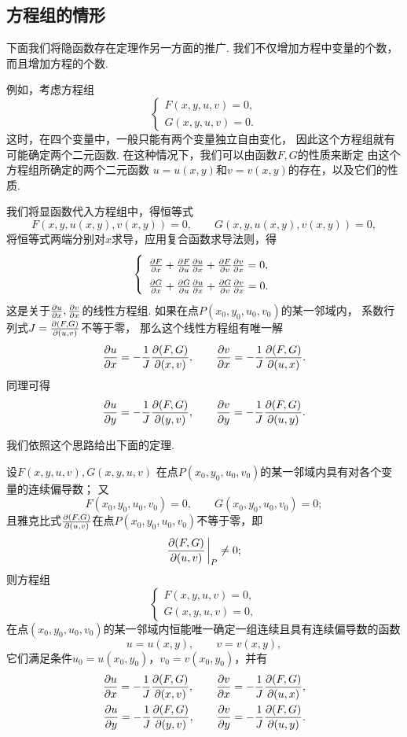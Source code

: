 \subsection{方程组的情形}
下面我们将隐函数存在定理作另一方面的推广.
我们不仅增加方程中变量的个数，而且增加方程的个数.

例如，考虑方程组\[
	\left\{ \begin{array}{c}
		F(x,y,u,v)=0, \\
		G(x,y,u,v)=0.
	\end{array} \right.
\]
这时，在四个变量中，一般只能有两个变量独立自由变化，
因此这个方程组就有可能确定两个二元函数.
在这种情况下，我们可以由函数\(F,G\)的性质来断定
由这个方程组所确定的两个二元函数
\(u=u(x,y)\)和\(v=v(x,y)\)的存在，以及它们的性质.

我们将显函数代入方程组中，得恒等式\[
	F(x,y,u(x,y),v(x,y))=0, \qquad
	G(x,y,u(x,y),v(x,y))=0,
\]
将恒等式两端分别对\(x\)求导，应用复合函数求导法则，得\[
	\left\{ \def\arraystretch{1.6} \begin{array}{l}
		\pdv{F}{x}+\pdv{F}{u}\pdv{u}{x}+\pdv{F}{v}\pdv{v}{x}=0, \\
		\pdv{G}{x}+\pdv{G}{u}\pdv{u}{x}+\pdv{G}{v}\pdv{v}{x}=0.
	\end{array} \right.
\]
这是关于\(\pdv{u}{x},\pdv{v}{x}\)的线性方程组.
如果在点\(P(x_0,y_0,u_0,v_0)\)的某一邻域内，
系数行列式\(J=\pdv{ (F,G) }{ (u,v) }\)不等于零，
那么这个线性方程组有唯一解\[
	\pdv{u}{x} = -\frac{1}{J} \pdv{ (F,G) }{ (x,v) }, \qquad
	\pdv{v}{x} = -\frac{1}{J} \pdv{ (F,G) }{ (u,x) }.
\]
同理可得\[
	\pdv{u}{y} = -\frac{1}{J} \pdv{ (F,G) }{ (y,v) }, \qquad
	\pdv{v}{y} = -\frac{1}{J} \pdv{ (F,G) }{ (u,y) }.
\]

我们依照这个思路给出下面的定理.
\begin{theorem}[隐函数存在定理3]\label{theorem:多元函数微分法.隐函数存在定理3}
设\(F(x,y,u,v),G(x,y,u,v)\)
在点\(P(x_0,y_0,u_0,v_0)\)的某一邻域内具有对各个变量的连续偏导数；
又\[
	F(x_0,y_0,u_0,v_0)=0, \qquad
	G(x_0,y_0,u_0,v_0)=0;
\]
且雅克比式\(\pdv{ (F,G) }{ (u,v) }\)在点\(P(x_0,y_0,u_0,v_0)\)不等于零，即\[
	\jacobi{F,G}{u,v}\eval_P \neq0;
\]
则方程组\[
	\left\{ \begin{array}{c}
		F(x,y,u,v)=0, \\
		G(x,y,u,v)=0,
	\end{array} \right.
\]
在点\((x_0,y_0,u_0,v_0)\)的某一邻域内恒能唯一确定一组连续且具有连续偏导数的函数
\[
	u=u(x,y), \qquad
	v=v(x,y),
\]
它们满足条件\(u_0=u(x_0,y_0)\)，\(v_0=v(x_0,y_0)\)，并有
\begin{equation}\label{equation:多元函数微分法.隐函数存在定理3.一阶偏导数}
	\begin{split}
		\pdv{u}{x}
		= -\frac{1}{J} \pdv{(F,G)}{(x,v)},
		\qquad
		\pdv{v}{x}
		= -\frac{1}{J} \pdv{(F,G)}{(u,x)},
		\\
		\pdv{u}{y}
		= -\frac{1}{J} \pdv{(F,G)}{(y,v)},
		\qquad
		\pdv{v}{y}
		= -\frac{1}{J} \pdv{(F,G)}{(u,y)}.
	\end{split}
\end{equation}
\end{theorem}


